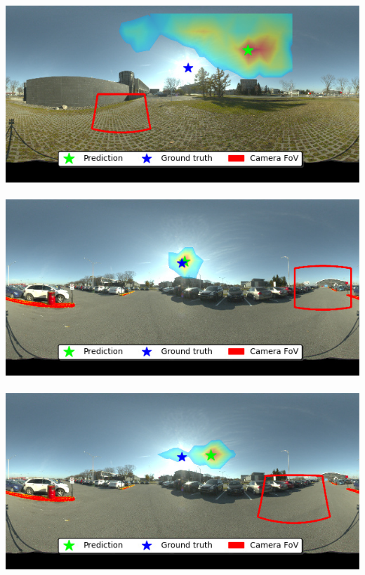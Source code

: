 \begin{minipage}{\linewidth}
\begin{multicols}{4}
\includegraphics[width=\mywidth]{AG8A2917_Panorama_hdr-corrected_013.jpg}\\
\vspace{\panoheight}\\
\includegraphics[width=\mywidth]{AG8A2959_Panorama_hdr-corrected_012.jpg}\\
\vspace{\panoheight}\\
\includegraphics[width=\mywidth]{AG8A2959_Panorama_hdr-corrected.jpg}




\end{multicols}
\end{minipage}
